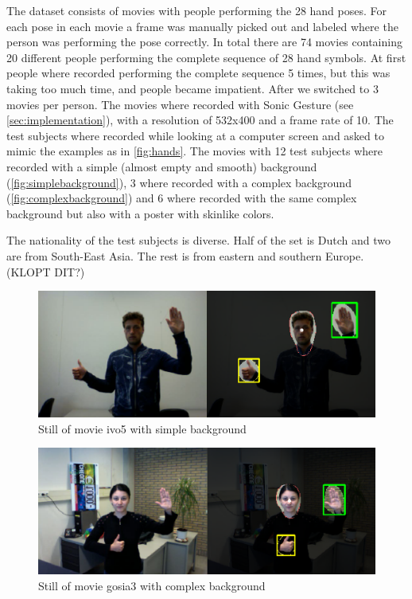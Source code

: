The dataset consists of movies with people performing the 28 hand poses. For each pose in each movie a frame was manually picked out and labeled where the person was performing the pose correctly. In total there are 74 movies containing 20 different people performing the complete sequence of 28 hand symbols. At first people where recorded performing the complete sequence 5 times, but this was taking too much time, and people became impatient. After we switched to 3 movies per person. The movies where recorded with Sonic Gesture (see \autoref{sec:implementation}), with a resolution of 532x400 and a frame rate of 10. The test subjects where recorded while looking at a computer screen and asked to mimic the examples as in \autoref{fig:hands}. The movies with 12 test subjects where recorded with a simple (almost empty and smooth) background (\autoref{fig:simplebackground}), 3 where recorded with a complex background (\autoref{fig:complexbackground}) and 6 where recorded with the same complex background but also with a poster with skinlike colors.

The nationality of the test subjects is diverse. Half of the set is Dutch and two are from South-East Asia. The rest is from eastern and southern Europe. (KLOPT DIT?)

\begin{figure}[htbp]
\center{}
\includegraphics[width=0.8\linewidth]{figures/simple.png}
\caption{Still of movie ivo5 with simple background}
\label{fig:simplebackground}
\end{figure}

\begin{figure}[htbp]
\center{}
\includegraphics[width=0.8\linewidth]{figures/complex.png}
\caption{Still of movie gosia3 with complex background}
\label{fig:complexbackground}
\end{figure}

